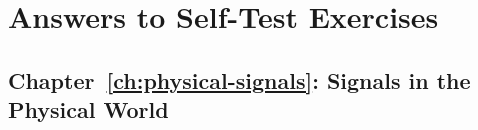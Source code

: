 
%
%
% 
% 
% 

\chapter{Answers to Self-Test Exercises}
\label{ap:exercise-answers}

\section{Chapter~\ref{ch:physical-signals}: Signals in the Physical World}
\label{sc:ch1ex}

